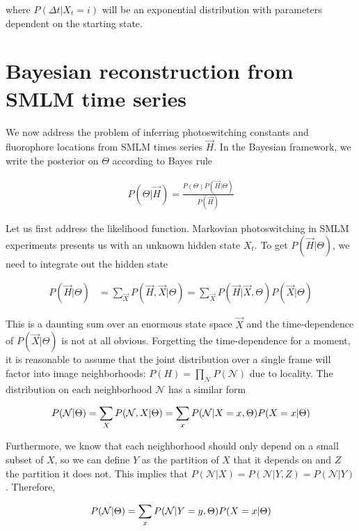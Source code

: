 \documentclass{ucetd}
\begin{document}
where $P(\Delta t | X_{t} = i) $ will be an exponential distribution with parameters dependent on the starting state. 

\section{Bayesian reconstruction from SMLM time series}


We now address the problem of inferring photoswitching constants and fluorophore locations from SMLM times series $\vec{H}$. In the Bayesian framework, we write the posterior on $\Theta$ according to Bayes rule

\begin{align*}
P(\Theta|\vec{H}) = \frac{P(\Theta)P(\vec{H}|\Theta)}{P(\vec{H})}
\end{align*}

Let us first address the likelihood function. Markovian photoswitching in SMLM experiments presents us with an unknown hidden state $X_{t}$. To get $P(\vec{H}|\Theta)$, we need to integrate out the hidden state

\begin{align*}
P(\vec{H}|\Theta) &= \sum_{\vec{X}} P(\vec{H},\vec{X}|\Theta) = \sum_{\vec{X}} P(\vec{H}|\vec{X},\Theta)P(\vec{X}|\Theta)
\end{align*}

This is a daunting sum over an enormous state space $\vec{X}$ and the time-dependence of $P(\vec{X}|\Theta)$ is not at all obvious. Forgetting the time-dependence for a moment, it is reasonable to assume that the joint distribution over a single frame will factor into image neighborhoods: $P(H) = \prod_{\mathcal{N}}P(\mathcal{N})$ due to locality. The distribution on each neighborhood $\mathcal{N}$ has a similar form

\begin{equation*}
P(\mathcal{N}|\Theta) = \sum_{X}P(\mathcal{N},X|\Theta) = \sum_{x}P(\mathcal{N}|X=x,\Theta)P(X=x|\Theta)\\
\end{equation*}

Furthermore, we know that each neighborhood should only depend on a small subset of $X$, so we can define $Y$ as the partition of $X$ that it depends on and $Z$ the partition it does not. This implies that $P(\mathcal{N}|X) = P(\mathcal{N}|Y,Z) = P(\mathcal{N}|Y)$. Therefore,


\begin{equation*}
P(\mathcal{N}|\Theta) = \sum_{x}P(\mathcal{N}|Y=y,\Theta)P(X=x|\Theta)\\
\end{equation*}
\end{document}
